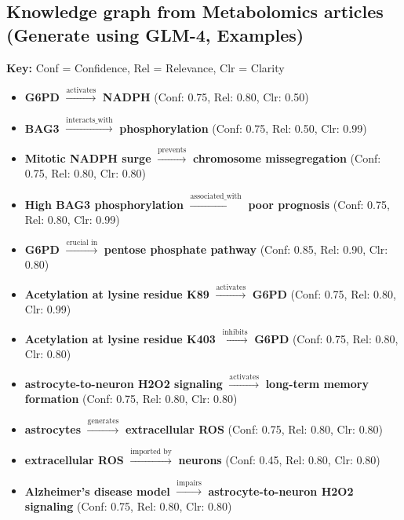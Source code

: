 \documentclass{article}
\begin{document}
\subsection{Knowledge graph from Metabolomics articles (Generate using GLM-4, Examples)}
\vspace{2mm}
\label{subsec:kg-metabolomics}
\begin{tcolorbox}[
    colframe=black!25,
    colback=black!5,
    boxrule=0.5pt,
    arc=2pt,
    title=Metabolomics Knowledge Graph Triples,
    fonttitle=\bfseries,
    coltitle=black,
    ]
\small
\textbf{Key:} Conf = Confidence, Rel = Relevance, Clr = Clarity\\
\begin{itemize}
    \item \textbf{G6PD} $\xrightarrow{\text{activates}}$ \textbf{NADPH} (Conf: 0.75, Rel: 0.80, Clr: 0.50)
    \item \textbf{BAG3} $\xrightarrow{\text{interacts\_with}}$ \textbf{phosphorylation} (Conf: 0.75, Rel: 0.50, Clr: 0.99)
    \item \textbf{Mitotic NADPH surge} $\xrightarrow{\text{prevents}}$ \textbf{chromosome missegregation} (Conf: 0.75, Rel: 0.80, Clr: 0.80)
    \item \textbf{High BAG3 phosphorylation} $\xrightarrow{\text{associated\_with}}$ \textbf{poor prognosis} (Conf: 0.75, Rel: 0.80, Clr: 0.99)
    \item \textbf{G6PD} $\xrightarrow{\text{crucial in}}$ \textbf{pentose phosphate pathway} (Conf: 0.85, Rel: 0.90, Clr: 0.80)
    \item \textbf{Acetylation at lysine residue K89} $\xrightarrow{\text{activates}}$ \textbf{G6PD} (Conf: 0.75, Rel: 0.80, Clr: 0.99)
    \item \textbf{Acetylation at lysine residue K403} $\xrightarrow{\text{inhibits}}$ \textbf{G6PD} (Conf: 0.75, Rel: 0.80, Clr: 0.80)
    \item \textbf{astrocyte-to-neuron H2O2 signaling} $\xrightarrow{\text{activates}}$ \textbf{long-term memory formation} (Conf: 0.75, Rel: 0.80, Clr: 0.80)
    \item \textbf{astrocytes} $\xrightarrow{\text{generates}}$ \textbf{extracellular ROS} (Conf: 0.75, Rel: 0.80, Clr: 0.80)
    \item \textbf{extracellular ROS} $\xrightarrow{\text{imported by}}$ \textbf{neurons} (Conf: 0.45, Rel: 0.80, Clr: 0.80)
    \item \textbf{Alzheimer's disease model} $\xrightarrow{\text{impairs}}$ \textbf{astrocyte-to-neuron H2O2 signaling} (Conf: 0.75, Rel: 0.80, Clr: 0.80)

\end{itemize}
\end{tcolorbox}
\end{document}
